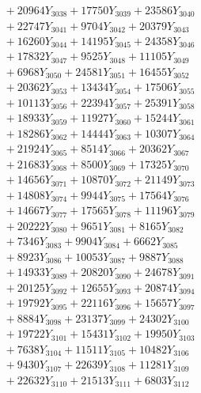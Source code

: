 \documentclass[a4paper,10pt]{article}
\begin{document}
{\begin{align}
&\;  + 20964 Y_{3038} + 17750 Y_{3039} + 23586 Y_{3040} \\[0.3ex]
&\;  + 22747 Y_{3041} + 9704 Y_{3042} + 20379 Y_{3043} \\[0.3ex]
&\;  + 16260 Y_{3044} + 14195 Y_{3045} + 24358 Y_{3046} \\[0.3ex]
&\;  + 17832 Y_{3047} + 9525 Y_{3048} + 11105 Y_{3049} \\[0.3ex]
&\;  + 6968 Y_{3050} + 24581 Y_{3051} + 16455 Y_{3052} \\[0.3ex]
&\;  + 20362 Y_{3053} + 13434 Y_{3054} + 17506 Y_{3055} \\[0.3ex]
&\;  + 10113 Y_{3056} + 22394 Y_{3057} + 25391 Y_{3058} \\[0.5ex]\allowbreak
&\;  + 18933 Y_{3059} + 11927 Y_{3060} + 15244 Y_{3061} \\[0.3ex]
&\;  + 18286 Y_{3062} + 14444 Y_{3063} + 10307 Y_{3064} \\[0.3ex]
&\;  + 21924 Y_{3065} + 8514 Y_{3066} + 20362 Y_{3067} \\[0.3ex]
&\;  + 21683 Y_{3068} + 8500 Y_{3069} + 17325 Y_{3070} \\[0.3ex]
&\;  + 14656 Y_{3071} + 10870 Y_{3072} + 21149 Y_{3073} \\[0.3ex]
&\;  + 14808 Y_{3074} + 9944 Y_{3075} + 17564 Y_{3076} \\[0.3ex]
&\;  + 14667 Y_{3077} + 17565 Y_{3078} + 11196 Y_{3079} \\[0.3ex]
&\;  + 20222 Y_{3080} + 9651 Y_{3081} + 8165 Y_{3082} \\[0.3ex]
&\;  + 7346 Y_{3083} + 9904 Y_{3084} + 6662 Y_{3085} \\[0.3ex]
&\;  + 8923 Y_{3086} + 10053 Y_{3087} + 9887 Y_{3088} \\[0.5ex]\allowbreak
&\;  + 14933 Y_{3089} + 20820 Y_{3090} + 24678 Y_{3091} \\[0.3ex]
&\;  + 20125 Y_{3092} + 12655 Y_{3093} + 20874 Y_{3094} \\[0.3ex]
&\;  + 19792 Y_{3095} + 22116 Y_{3096} + 15657 Y_{3097} \\[0.3ex]
&\;  + 8884 Y_{3098} + 23137 Y_{3099} + 24302 Y_{3100} \\[0.3ex]
&\;  + 19722 Y_{3101} + 15431 Y_{3102} + 19950 Y_{3103} \\[0.3ex]
&\;  + 7638 Y_{3104} + 11511 Y_{3105} + 10482 Y_{3106} \\[0.3ex]
&\;  + 9430 Y_{3107} + 22639 Y_{3108} + 11281 Y_{3109} \\[0.3ex]
&\;  + 22632 Y_{3110} + 21513 Y_{3111} + 6803 Y_{3112} \\[0.3ex]

\end{align}}
\end{document}
